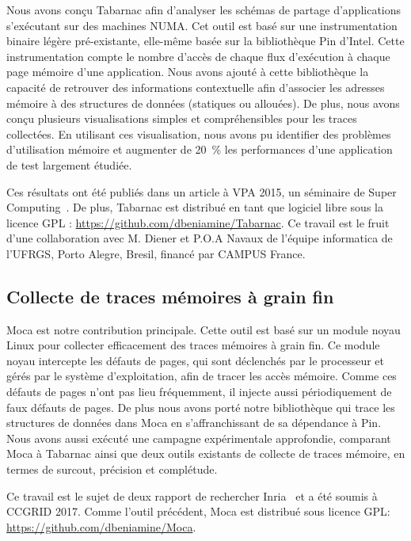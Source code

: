 Nous avons conçu \gls{Tabarnac} afin d'analyser les schémas de partage d'applications s'exécutant sur des machines NUMA.
Cet outil est basé sur une instrumentation binaire légère pré-existante, elle-même basée sur la bibliothèque \gls{Pin} d'\gls{Intel}.
Cette instrumentation compte le nombre d'accès de chaque flux d'exécution à chaque page mémoire d'une application.
Nous avons ajouté à cette bibliothèque la capacité de retrouver des informations contextuelle afin d'associer les adresses mémoire à des structures de données (statiques ou allouées).
De plus, nous avons conçu plusieurs visualisations simples et compréhensibles pour les traces collectées.
En utilisant ces visualisation, nous avons pu identifier des problèmes d'utilisation mémoire et augmenter de \SI{20}{\%} les performances d'une application de test largement étudiée.

Ces résultats ont été publiés dans un article à \gls{VPA} 2015, un séminaire de Super Computing~\cite{Beniamine15TABARNAC}.
De plus, \gls{Tabarnac} est distribué en tant que logiciel libre sous la licence \gls{GPL} : \url{https://github.com/dbeniamine/Tabarnac}.
Ce travail est le fruit d'une collaboration avec M. Diener et P.O.A Navaux de l'équipe informatica de l'\gls{UFRGS}, Porto Alegre, Bresil, financé par CAMPUS France.

\subsection*{Collecte de traces mémoires à grain fin}

\gls{Moca} est notre contribution principale.
Cette outil est basé sur un module noyau \gls{Linux} pour collecter efficacement des traces mémoires à grain fin.
Ce module noyau intercepte les défauts de pages, qui sont déclenchés par le processeur et gérés par le système d'exploitation, afin de tracer les accès mémoire.
Comme ces défauts de pages n'ont pas lieu fréquemment, il injecte aussi périodiquement de faux défauts de pages.
De plus nous avons porté notre bibliothèque qui trace les structures de données dans \gls{Moca} en s'affranchissant de sa dépendance à \gls{Pin}.
Nous avons aussi exécuté une campagne expérimentale approfondie, comparant \gls{Moca} à \gls{Tabarnac} ainsi que deux outils existants de collecte de traces mémoire, en termes de surcout, précision et complétude.

Ce travail est le sujet de deux rapport de rechercher Inria~\cite{Beniamine15Memory,Beniamine16Moca} et a été soumis à \gls{CCGRID} 2017.
Comme l'outil précédent, \gls{Moca} est distribué sous licence \gls{GPL}: \url{https://github.com/dbeniamine/Moca}.


